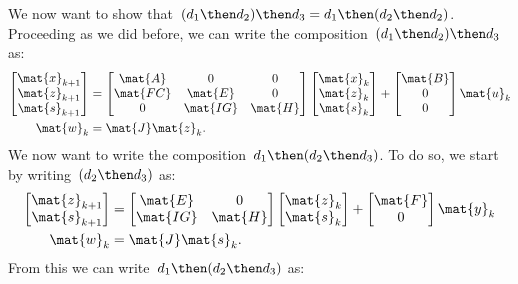 We now want to show that~$(d_1\then d_2)\then d_3=d_1\then (d_2\then d_2)$.  Proceeding as we did before, we can write the composition~$(d_1\then d_2)\then d_3$ as:
\begin{equation*}
\label{eq:dlin-5}
\begin{aligned}
\begin{bmatrix}
\mat{x}_{k+1}\\
\mat{z}_{k+1}\\
\mat{s}_{k+1}
\end{bmatrix}&=
\begin{bmatrix}
\mat{A}&0&0\\
\mat{FC}&\mat{E}&0\\
0&\mat{IG}&\mat{H}
\end{bmatrix}\begin{bmatrix} \mat{x}_k\\ \mat{z}_k\\ \mat{s}_k\end{bmatrix}+
\begin{bmatrix}
\mat{B}\\ 0\\ 0
\end{bmatrix}\mat{u}_k\\
\mat{w}_k&=\mat{J}\mat{z}_k.
\end{aligned}
\end{equation*}
We now want to write the composition~$d_1\then (d_2\then d_3)$. To do so, we start by writing~$(d_2\then d_3)$ as:
\begin{equation*}
\label{eq:dlin-6}
\begin{aligned}
\begin{bmatrix}
\mat{z}_{k+1}\\
\mat{s}_{k+1}
\end{bmatrix}&=
\begin{bmatrix}
\mat{E}&0\\
\mat{IG}&\mat{H}
\end{bmatrix}\begin{bmatrix} \mat{z}_k\\ \mat{s}_k\end{bmatrix}+
\begin{bmatrix}
\mat{F}\\ 0
\end{bmatrix}\mat{y}_k\\
\mat{w}_k&=\mat{J}\mat{s}_k.
\end{aligned}
\end{equation*}
From this we can write~$d_1\then (d_2\then d_3)$ as:
